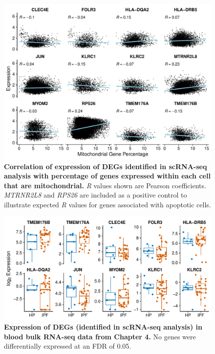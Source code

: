 \documentclass[
]{article}
\begin{document}
\begin{figure}

{\centering \includegraphics[width=0.9\linewidth,]{./Figures/scRNAseq/mt_correlation_v1} 

}

\caption[scRNAseq DEG correlation with MT\%]{\textbf{Correlation of expression of DEGs identified in scRNA-seq analysis with percentage of genes expressed within each cell that are mitochondrial.} \textit{R} values shown are Pearson coefficients. \textit{MTRNR2L8} and \textit{RPS26} are included as a positive control to illustrate expected \textit{R} values for genes associated with apoptotic cells.}\label{fig:mtcorr}
\end{figure}



\begin{figure}

{\centering \includegraphics[width=0.8\linewidth,]{./Figures/scRNAseq/bulk_comparison_v1} 

}

\caption[scRNAseq DEG expression in bulk RNA-seq]{\textbf{Expression of DEGs (identified in scRNA-seq analysis) in blood bulk RNA-seq data from Chapter 4.} No genes were differentially expressed at an FDR of 0.05.}\label{fig:bulkscrnaseq}
\end{figure}
\end{document}
